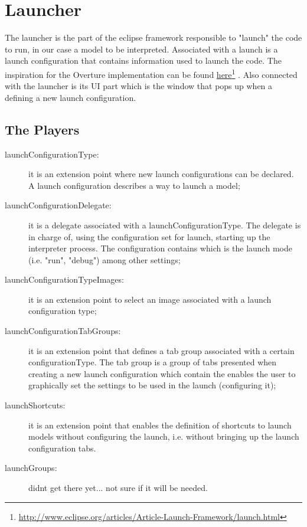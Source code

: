\section{Launcher}
The launcher is the part of the eclipse framework responsible to "launch" the code to run, in our case a model to be interpreted. Associated with a launch is a launch configuration that contains information used to launch the code. The inspiration for the Overture implementation can be found \href{http://www.eclipse.org/articles/Article-Launch-Framework/launch.html}{here}\footnote{\url{http://www.eclipse.org/articles/Article-Launch-Framework/launch.html}} \cite{Szurszewski03}. 
Also connected with the launcher is its UI part which is the window that pops up when a defining a new launch configuration.

\subsection{The Players}

\begin{description}
\item[launchConfigurationType:] it is an extension point where new launch configurations can be declared. A launch configuration describes a way to launch a model; 

\item[launchConfigurationDelegate:] it is a delegate associated with a launchConfigurationType. The delegate is in charge of, using the configuration set for launch, starting up the interpreter process. The configuration contains which is the launch mode (i.e. "run", "debug") among other settings;

\item[launchConfigurationTypeImages:] it is an extension point to select an image associated with a launch configuration type;

\item[launchConfigurationTabGroups:] it is an extension point that defines a tab group associated with a certain configurationType. The tab group is a group of tabs presented when creating a new launch configuration which contain the enables the user to graphically set the settings to be used in the launch (configuring it);

\item[launchShortcuts:] it is an extension point that enables the definition of shortcuts to launch models without configuring the launch, i.e. without bringing up the launch configuration tabs.

\item[launchGroups:] didnt get there yet... not sure if it will be needed.

\end{description}

